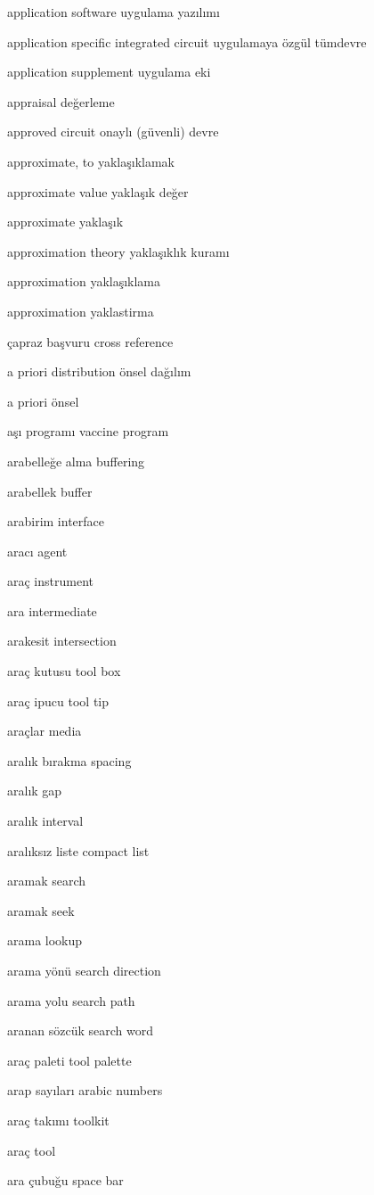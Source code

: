 \documentclass[12pt,fleqn]{article}\usepackage{../../common}
\begin{document}
application software uygulama yazılımı

application specific integrated circuit uygulamaya özgül tümdevre

application supplement uygulama eki

appraisal değerleme

approved circuit onaylı (güvenli) devre

approximate, to yaklaşıklamak

approximate value yaklaşık değer

approximate yaklaşık

approximation theory yaklaşıklık kuramı

approximation yaklaşıklama

approximation yaklastirma

çapraz başvuru cross reference

a priori distribution önsel dağılım

a priori önsel

aşı programı vaccine program

arabelleğe alma buffering

arabellek buffer

arabirim interface

aracı agent

araç instrument

ara intermediate

arakesit intersection

araç kutusu tool box

araç ipucu tool tip

araçlar media

aralık bırakma spacing

aralık gap

aralık interval

aralıksız liste compact list

aramak search

aramak seek

arama lookup

arama yönü search direction

arama yolu search path

aranan sözcük search word

araç paleti tool palette

arap sayıları arabic numbers

araç takımı toolkit

araç tool

ara çubuğu space bar
\end{document}
